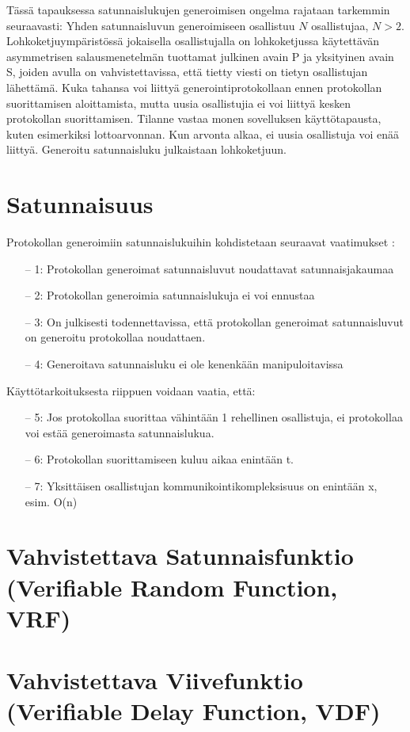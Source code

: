 Tässä tapauksessa satunnaislukujen generoimisen ongelma rajataan tarkemmin seuraavasti:
Yhden satunnaisluvun generoimiseen osallistuu $N$ osallistujaa,  $N > 2$. Lohkoketjuympäristössä jokaisella osallistujalla on lohkoketjussa käytettävän asymmetrisen salausmenetelmän tuottamat julkinen avain P ja yksityinen avain S, joiden avulla on vahvistettavissa, että tietty viesti on tietyn osallistujan lähettämä. Kuka tahansa voi liittyä generointiprotokollaan ennen protokollan suorittamisen aloittamista, mutta uusia osallistujia ei voi liittyä kesken protokollan suorittamisen. Tilanne vastaa monen sovelluksen käyttötapausta, kuten esimerkiksi lottoarvonnan. Kun arvonta alkaa, ei uusia osallistuja voi enää liittyä. Generoitu satunnaisluku julkaistaan lohkoketjuun. 

\section{Satunnaisuus}

Protokollan generoimiin satunnaislukuihin kohdistetaan seuraavat vaatimukset \cite{simic_review_2020}:
\begin{itemize}
    \item[--] 1: Protokollan generoimat satunnaisluvut noudattavat satunnaisjakaumaa
    \item[--] 2: Protokollan generoimia satunnaislukuja ei voi ennustaa
    \item[--] 3: On julkisesti todennettavissa, että protokollan generoimat satunnaisluvut on generoitu protokollaa noudattaen.
    \item[--] 4: Generoitava satunnaisluku ei ole kenenkään manipuloitavissa
\end{itemize}\textbf{}
Käyttötarkoituksesta riippuen voidaan vaatia, että:

\begin{itemize}
    \item[--] 5: Jos protokollaa suorittaa vähintään 1 rehellinen osallistuja, ei protokollaa voi estää generoimasta satunnaislukua.
    \item[--] 6: Protokollan suorittamiseen kuluu aikaa enintään t.
    \item[--] 7: Yksittäisen osallistujan kommunikointikompleksisuus on enintään x, esim. O(n)
\end{itemize}

\section{Vahvistettava Satunnaisfunktio (Verifiable Random Function, VRF)}

\section{Vahvistettava Viivefunktio (Verifiable Delay Function, VDF)}